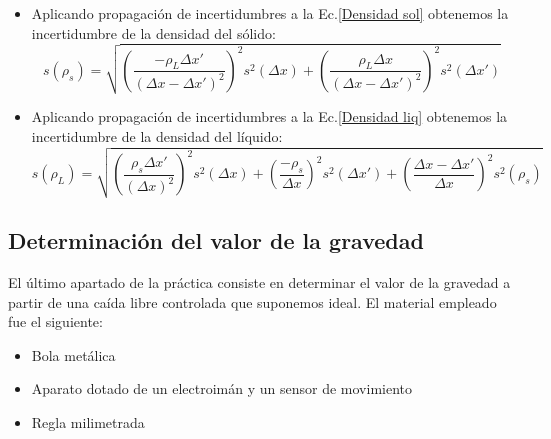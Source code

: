 \documentclass[a4paper,12pt,titlepage]{article}
\begin{document}
\begin{itemize}
    \item Aplicando propagación de incertidumbres a la Ec.\ref{Densidad sol} obtenemos la incertidumbre de la densidad del sólido:
    \begin{equation}
        s(\rho_s)=\sqrt{\left (\frac{-\rho_L \Delta x'}{(\Delta x -\Delta x')^2} \right )^2s^2(\Delta x) + \left (\frac{\rho_L \Delta x}{(\Delta x - \Delta x')^2}\right )^2s^2(\Delta x')}
        \label{Inc densidad solido}
    \end{equation}
    \item Aplicando propagación de incertidumbres a la Ec.\ref{Densidad liq} obtenemos la incertidumbre de la densidad del líquido:
    \begin{equation}
        s(\rho_L) = \sqrt{ \left (\frac{\rho_s\Delta x'}{(\Delta x)^2}\right )^2s^2(\Delta x) + \left (\frac{-\rho_s}{\Delta x} \right )^2s^2(\Delta x') + \left (\frac{\Delta x -\Delta x'}{\Delta x}\right )^2s^2(\rho_s)}
        \label{Inc densidad liquido}
    \end{equation}
\end{itemize}

\subsection{Determinación del valor de la gravedad}

El último apartado de la práctica consiste en determinar el valor de la gravedad a partir de una caída libre controlada que suponemos ideal. El material empleado fue el siguiente:

\begin{itemize}
    \item Bola metálica
    \item Aparato dotado de un electroimán y un sensor de movimiento
    \item Regla milimetrada
\end{itemize}
\end{document}
